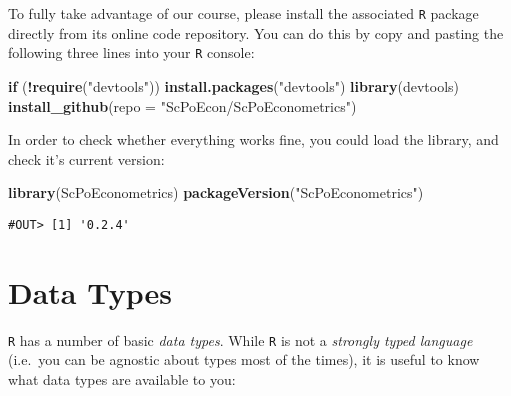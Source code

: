 \documentclass[]{book}
\newenvironment{Shaded}{\begin{snugshade}}{\end{snugshade}}
\newcommand{\KeywordTok}[1]{\textcolor[rgb]{0.13,0.29,0.53}{\textbf{#1}}}
\newcommand{\DataTypeTok}[1]{\textcolor[rgb]{0.13,0.29,0.53}{#1}}
\newcommand{\StringTok}[1]{\textcolor[rgb]{0.31,0.60,0.02}{#1}}
\newcommand{\ControlFlowTok}[1]{\textcolor[rgb]{0.13,0.29,0.53}{\textbf{#1}}}
\newcommand{\OperatorTok}[1]{\textcolor[rgb]{0.81,0.36,0.00}{\textbf{#1}}}
\newcommand{\NormalTok}[1]{#1}
\begin{document}
To fully take advantage of our course, please install the associated
\texttt{R} package directly from its online code repository. You can do
this by copy and pasting the following three lines into your \texttt{R}
console:

\begin{Shaded}
\begin{Highlighting}[]
\ControlFlowTok{if}\NormalTok{ (}\OperatorTok{!}\KeywordTok{require}\NormalTok{(}\StringTok{"devtools"}\NormalTok{)) }\KeywordTok{install.packages}\NormalTok{(}\StringTok{"devtools"}\NormalTok{)}
\KeywordTok{library}\NormalTok{(devtools)}
\KeywordTok{install_github}\NormalTok{(}\DataTypeTok{repo =} \StringTok{"ScPoEcon/ScPoEconometrics"}\NormalTok{)}
\end{Highlighting}
\end{Shaded}

In order to check whether everything works fine, you could load the
library, and check it's current version:

\begin{Shaded}
\begin{Highlighting}[]
\KeywordTok{library}\NormalTok{(ScPoEconometrics)}
\KeywordTok{packageVersion}\NormalTok{(}\StringTok{"ScPoEconometrics"}\NormalTok{)}
\end{Highlighting}
\end{Shaded}

\begin{verbatim}
#OUT> [1] '0.2.4'
\end{verbatim}

\section{Data Types}\label{data-types}

\texttt{R} has a number of basic \emph{data types}. While \texttt{R} is
not a \emph{strongly typed language} (i.e.~you can be agnostic about
types most of the times), it is useful to know what data types are
available to you:
\end{document}
